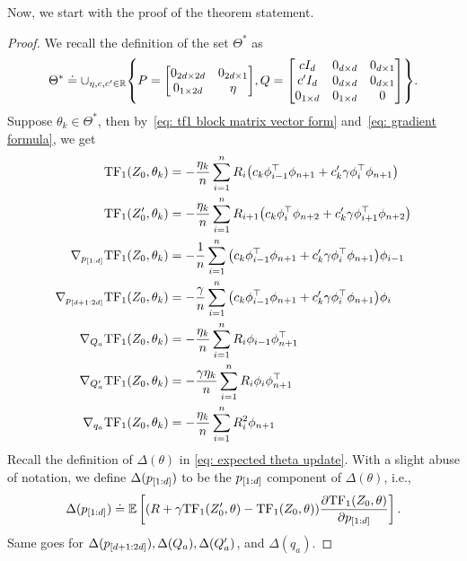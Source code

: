 \documentclass{article}
\newcommand{\R}{\mathbb{R}}
\newcommand{\E}{\mathbb{E}}
\newcommand{\tf}{\text{TF}}
\begin{document}
Now, we start with the proof of the theorem statement.
\begin{proof}
    We recall the definition of the set $\Theta^*$ as
    \begin{align} \label{eq:tf_simplified}
        \Theta^* \doteq 
        \cup_{\eta, c, c' \in \R} 
        \qty{P = \mqty[0_{2d \times 2d} & 0_{2d \times 1} \\ 0_{1 \times 2d} & \eta], 
        Q =  \mqty[c I_d & 0_{d \times d} & 0_{d \times 1} \\c'I_d  & 0_{d \times d} & 0_{d \times 1} \\ 0_{1 \times d} & 0_{1 \times d} & 0]}.
    \end{align}
    Suppose $\theta_k \in \Theta^*$, then by~\eqref{eq: tf1 block matrix vector form} and~\eqref{eq: gradient formula}, we get
    \begin{align}
         \tf_1(Z_0, \theta_k) 
         &= -\frac{\eta_k}{n}\sum_{i=1}^n  R_i \qty( c_k \phi_{i-1}^\top \phi_{n+1} + c'_k \gamma \phi_{i}^\top \phi_{n+1}) \label{eq: tf1 theta belongs to Theta}\\
         \tf_1(Z'_0, \theta_k) 
         &= -\frac{\eta_k}{n}\sum_{i=1}^n  R_{i+1} \qty( c_k \phi_{i}^\top \phi_{n+2} + c'_k \gamma \phi_{i+1}^\top \phi_{n+2}) \label{eq: tf1 prime theta belongs to Theta}\\
         \nabla_{p_{[1:d]}} \tf_1(Z_0, \theta_k) 
         & = -\frac{1}{n}\sum_{i=1}^n \qty( c_k \phi_{i-1}^\top \phi_{n+1} + c'_k \gamma \phi_{i}^\top \phi_{n+1})\phi_{i-1}
         \label{eq: tf1 p[1:d] grad theta belongs to Theta}\\
         \nabla_{p_{[d+1:2d]}} \tf_1(Z_0, \theta_k) 
         & = -\frac{\gamma}{n}\sum_{i=1}^n \qty( c_k \phi_{i-1}^\top \phi_{n+1} + c'_k \gamma \phi_{i}^\top \phi_{n+1})\phi_i
         \label{eq: tf1 p[d+1:2d] grad theta belongs to Theta}\\
         \nabla_{Q_a} \tf_1(Z_0, \theta_k) 
         & = -\frac{\eta_k}{n} \sum_{i=1}^n R_i  \phi_{i-1} \phi_{n+1}^\top
         \label{eq: tf1 Q_a grad theta belongs to Theta}\\
         \nabla_{Q'_a} \tf_1(Z_0, \theta_k) 
         & = -\frac{\gamma \eta_k}{n} \sum_{i=1}^n  R_i  \phi_i \phi_{n+1}^\top
         \label{eq: tf1 Q'_a grad theta belongs to Theta}\\
         \nabla_{q_a} \tf_1(Z_0, \theta_k) 
         & = -\frac{\eta_k}{n} \sum_{i=1}^n  R_i^2 \phi_{n+1}
         \label{eq: tf1 q_a grad theta belongs to Theta}
    \end{align}
Recall the definition of $\Delta(\theta)$ in \eqref{eq: expected theta update}. With a slight abuse of notation, we define $\Delta(p_\qty[{1:d}])$ to be the $p_\qty[{1:d}]$ component of $\Delta(\theta)$,
i.e.,
\begin{align}
\Delta(p_\qty[{1:d}]) \doteq \E\left[(R + \gamma \tf_1(Z_0', \theta) - \tf_1(Z_0, \theta)) \pdv{\tf_1(Z_0, \theta)}{p_\qty[1:d]}\right].
\end{align}
Same goes for $\Delta(p_\qty[{d+1:2d}]), \Delta(Q_a), \Delta(Q_a')$, and $\Delta(q_a)$.


\end{proof}
\end{document}
